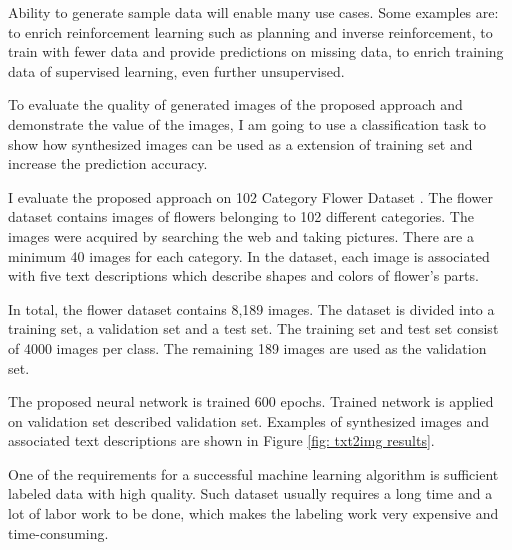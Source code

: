 \documentclass{iitthesis}
\begin{document}
Ability to generate sample data will enable many use cases. Some examples are: to enrich reinforcement learning such as planning and inverse reinforcement, to train with fewer data and provide predictions on missing data, to enrich training data of supervised learning, even further unsupervised. 

To evaluate the quality of generated images of the proposed approach and demonstrate the value of the images, I am going to use a classification task to show how synthesized images can be used as a extension of training set and increase the prediction accuracy.

I evaluate the proposed approach on 102 Category Flower Dataset \cite{Nilsback08}. The flower dataset contains images of flowers belonging to 102 different categories. The images were acquired by searching the web and taking pictures. There are a minimum 40 images for each category. In the dataset, each image is associated with five text descriptions which describe shapes and colors of flower's parts. 

In total, the flower dataset contains 8,189 images. The dataset is divided into a training set, a validation set and a test set. The training set and test set consist of 4000 images per class. The remaining 189 images are used as the validation set.

The proposed neural network is trained 600 epochs. Trained network is applied on validation set described validation set. Examples of synthesized images and associated text descriptions are shown in Figure \ref{fig: txt2img results}.   


One of the requirements for a successful machine learning algorithm is sufficient labeled data with high quality. Such dataset usually requires a long time and a lot of labor work to be done, which makes the labeling work very expensive and time-consuming. 
\end{document}
